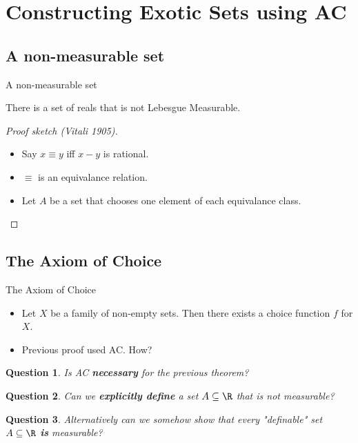 \documentclass{beamer}
\newtheorem*{question}{Question}
\begin{document}
\section{Constructing Exotic Sets using AC}

\subsection{A non-measurable set}

\begin{frame}{A non-measurable set}

\begin{theorem}
There is a set of reals that is not Lebesgue Measurable.
\end{theorem}

\begin{proof}[Proof sketch (Vitali 1905)]

\begin{itemize}
  \item Say $x\equiv y$ iff $x-y$ is rational.
  \item $\equiv$ is an equivalance relation.
  \item Let $A$ be a set that chooses one element of each equivalance class.
\end{itemize}
\end{proof}

\end{frame}


\subsection{The Axiom of Choice}

\begin{frame}{The Axiom of Choice}

\begin{itemize}
  \item Let $X$ be a family of non-empty sets. Then there exists a choice
  function $f$ for $X$.
  \item Previous proof used AC. How?
\end{itemize}

\begin{question}
Is AC \textbf{necessary} for the previous theorem?
\end{question}

\begin{question}
Can we \textbf{explicitly define} a set $A\subseteq \R$ that is not measurable?
\end{question}

\begin{question}
 Alternatively can we somehow show that every "definable" set
$A\subseteq \R$ \textbf{is} measurable?
\end{question}


\end{frame}
\end{document}
